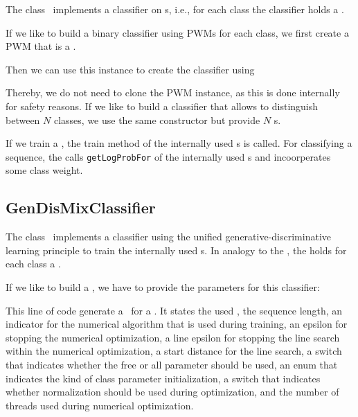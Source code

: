 The class \TrainSMBasedClassifier~implements a classifier on \TrainSM s, i.e., for each class the classifier holds a \TrainSM.
 
If we like to build a binary classifier using PWMs for each class, we first create a PWM that is a \TrainSM.

\addtocounter{off}{-35}

Then we can use this instance to create the classifier using 

\addtocounter{off}{3}

Thereby, we do not need to clone the PWM instance, as this is done internally for safety reasons. If we like to build a classifier that allows to distinguish between $N$ classes, we use the same constructor but provide $N$ \TrainSM s.

If we train a \TrainSMBasedClassifier, the train method of the internally used \TrainSM s is called. For classifying a sequence, the \TrainSMBasedClassifier calls \lstinline+getLogProbFor+ of the internally used \TrainSM s and incoorperates some class weight.

\subsection{GenDisMixClassifier}\label{GenDisMixClassifier}

The class \GenDisMixClassifier~implements a classifier using the unified generative-discriminative learning principle to train the internally used \DiffSM s. In analogy to the \TrainSMBasedClassifier, the \GenDisMixClassifier holds for each class a \DiffSM.

If we like to build a \GenDisMixClassifier, we have to provide the parameters for this classifier:

\addtocounter{off}{3}

This line of code generate a \ParameterSet~for a \GenDisMixClassifier. It states 
the used \AlphabetContainer,
the sequence length,
an indicator for the numerical algorithm that is used during training,
an epsilon for stopping the numerical optimization,
a line epsilon for stopping the line search within the numerical optimization,
a start distance for the line search,
a switch that indicates whether the free or all parameter should be used,
an enum that indicates the kind of class parameter initialization,
a switch that indicates whether normalization should be used during optimization,
and the number of threads used during numerical optimization.

